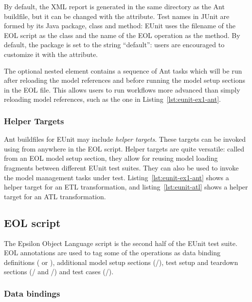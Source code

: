 By default, the XML report is generated in the same directory as the Ant buildfile, but it can be changed with the  attribute. Test names in JUnit are formed by its Java package, class and method: EUnit uses the filename of the EOL script as the class and the name of the EOL operation as the method. By default, the package is set to the string ``default'': users are encouraged to customize it with the  attribute.

The optional  nested element contains a sequence of Ant tasks which will be run after reloading the model references and before running the model setup sections in the EOL file. This allows users to run workflows more advanced than simply reloading model references, such as the one in Listing~\ref{lst:eunit-ex1-ant}.

\subsubsection{Helper Targets}

Ant buildfiles for EUnit may include \emph{helper targets}. These targets can be invoked using  from anywhere in the EOL script. Helper targets are quite versatile: called from an EOL model setup section, they allow for reusing model loading fragments between different EUnit test suites. They can also be used to invoke the model management tasks under test. Listing~\ref{lst:eunit-ex1-ant} shows a helper target for an ETL transformation, and listing~\ref{lst:eunit-atl} shows a helper target for an ATL transformation.

\subsection{EOL script}
\label{sec:eunit-eol-script}

The Epsilon Object Language script is the second half of the EUnit test suite. EOL annotations are used to tag some of the operations as data binding definitions ( or ), additional model setup sections (/), test setup and teardown sections (/ and /) and test cases (/).

\subsubsection{Data bindings}

